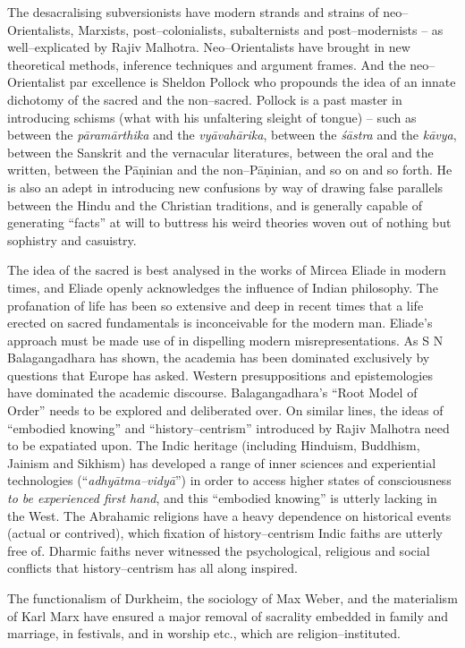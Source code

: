 The desacralising subversionists have modern strands and strains of neo–Orientalists, Marxists, post–colonialists, subalternists and post–modernists – as well–explicated by Rajiv Malhotra. Neo–Orientalists have brought in new theoretical methods, inference techniques and argument frames. And the neo–Orientalist par excellence is Sheldon Pollock who propounds the idea of an innate dichotomy of the sacred and the non–sacred. Pollock is a past master in introducing schisms (what with his unfaltering sleight of tongue) – such as between the \textit{pāramārthika} and the \textit{vyāvahārika}, between the \textit{śāstra} and the \textit{kāvya}, between the Sanskrit and the vernacular literatures, between the oral and the written, between the Pāṇinian and the non–Pāṇinian, and so on and so forth. He is also an adept in introducing new confusions by way of drawing false parallels between the Hindu and the Christian traditions, and is generally capable of generating “facts” at will to buttress his weird theories woven out of nothing but sophistry and casuistry.

The idea of the sacred is best analysed in the works of Mircea Eliade in modern times, and Eliade openly acknowledges the influence of Indian philosophy. The profanation of life has been so extensive and deep in recent times that a life erected on sacred fundamentals is inconceivable for the modern man. Eliade’s approach must be made use of in dispelling modern misrepresentations. As S N Balagangadhara has shown, the academia has been dominated exclusively by questions that Europe has asked. Western presuppositions and epistemologies have dominated the academic discourse. Balagangadhara’s “Root Model of Order” needs to be explored and deliberated over. On similar lines, the ideas of “embodied knowing” and “history–centrism” introduced by Rajiv Malhotra need to be expatiated upon. The Indic heritage (including Hinduism, Buddhism, Jainism and Sikhism) has developed a range of inner sciences and experiential technologies (“\textit{adhyātma–vidyā}”) in order to access higher states of consciousness \textit{to be experienced first hand}, and this “embodied knowing” is utterly lacking in the West. The Abrahamic religions have a heavy dependence on historical events (actual or contrived), which fixation of history–centrism Indic faiths are utterly free of. Dharmic faiths never witnessed the psychological, religious and social conflicts that history–centrism has all along inspired.

The functionalism of Durkheim, the sociology of Max Weber, and the materialism of Karl Marx have ensured a major removal of sacrality embedded in family and marriage, in festivals, and in worship etc., which are religion–instituted.

